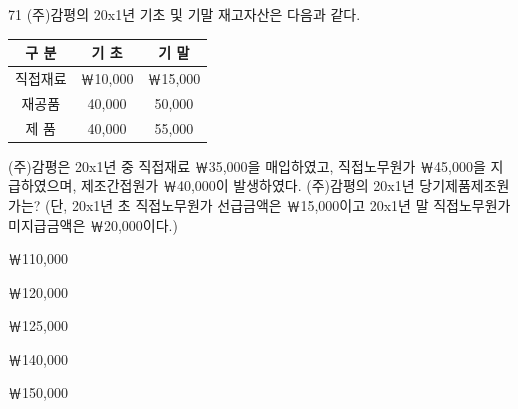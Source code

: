 \begin{question}{71}
(주)감평의 20x1년 기초 및 기말 재고자산은 다음과 같다.
\par{\small\centering\begin{tabular}{|c|c|c|}\hline
구 분 & 기 초 & 기 말 \\ \hline
직접재료 & ￦10,000 & ￦15,000 \\ \hline
재공품 & 40,000 & 50,000 \\ \hline
제 품 & 40,000 & 55,000 \\ \hline
\end{tabular}\par}
(주)감평은 20x1년 중 직접재료 ￦35,000을 매입하였고, 직접노무원가 ￦45,000을 지급하였으며, 제조간접원가 ￦40,000이 발생하였다. (주)감평의 20x1년 당기제품제조원가는? (단, 20x1년 초 직접노무원가 선급금액은 ￦15,000이고 20x1년 말 직접노무원가 미지급금액은 ￦20,000이다.)
\begin{choices}
  \item ￦110,000
  \item ￦120,000
  \item ￦125,000
  \item ￦140,000
  \item ￦150,000
\end{choices}
\end{question}
